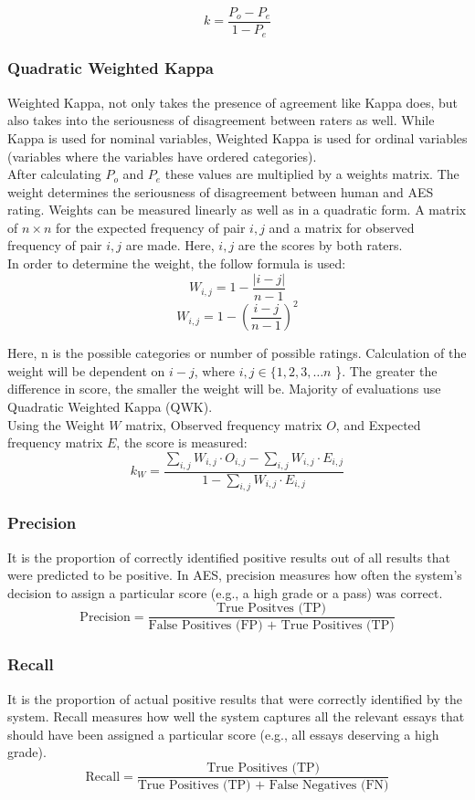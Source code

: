 \documentclass{article}
\begin{document}
$$k = \frac{P_o - P_e}{1 - P_e}$$

\subsubsection{Quadratic Weighted Kappa}
Weighted Kappa, not only takes the presence of agreement like Kappa does, but also takes into the seriousness of disagreement between raters as well. While Kappa is used for nominal variables, Weighted Kappa is used for ordinal variables (variables where the variables have ordered categories). \\
After calculating $P_o$ and $P_e$ these values are multiplied by a weights matrix. The weight determines the seriousness of disagreement between human and AES rating. Weights can be measured linearly as well as in a quadratic form. A matrix of $n \times n$ for the expected frequency of pair ${i, j}$ and a matrix for observed frequency of pair $i, j$ are made. Here, $i, j$ are the scores by both raters. \\
In order to determine the weight, the follow formula is used:
$$W_{i, j} = 1 - \frac{|i - j|}{n - 1}$$
$$W_{i, j} = 1 - \left( \frac{i - j}{n - 1} \right) ^2$$

Here, n is the possible categories or number of possible ratings. Calculation of the weight will be dependent on $i - j$, where $i, j \in \{ 1, 2, 3, \dots n$ \}. The greater the difference in score, the smaller the weight will be. Majority of evaluations use Quadratic Weighted Kappa (QWK). \\
Using the Weight $W$ matrix, Observed frequency matrix $O$, and Expected frequency matrix $E$, the score is measured:
$$k_W = \frac{\sum_{i, j} W_{i, j} \cdot O_{i, j} - \sum_{i, j} W_{i, j} \cdot E_{i, j}}{1 - \sum_{i, j} W_{i, j} \cdot E_{i,j}}$$
\subsubsection{Precision}
It is the proportion of correctly identified positive results out of all results that were predicted to be positive. In AES, precision measures how often the system's decision to assign a particular score (e.g., a high grade or a pass) was correct.
$$\text{Precision} = \frac{\text{True Positves (TP)}}{\text{False Positives (FP) + True Positives (TP)}}$$
\subsubsection{Recall}
It is the proportion of actual positive results that were correctly identified by the system. Recall measures how well the system captures all the relevant essays that should have been assigned a particular score (e.g., all essays deserving a high grade).
$$\text{Recall} = \frac{\text{True Positives (TP)}}{\text{True Positives (TP) + False Negatives (FN)}}$$
\end{document}
